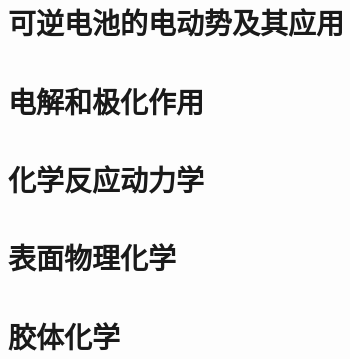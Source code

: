 \documentclass[a4paper]{ctexrep}
\begin{document}
    \chapter{可逆电池的电动势及其应用}

    \chapter{电解和极化作用}

    \chapter{化学反应动力学}

    \chapter{表面物理化学}

    \chapter{胶体化学}
\end{document}
